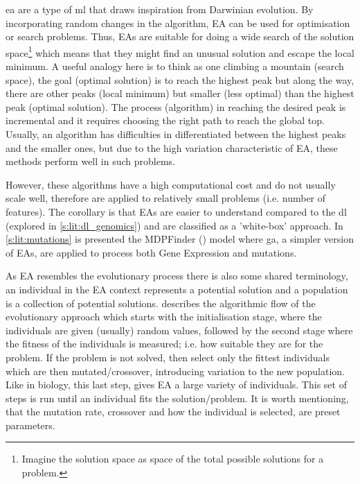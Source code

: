 \acrlong{ea} are a type of \acrshort{ml} that draws inspiration from Darwinian evolution. By incorporating random changes in the algorithm, EA can be used for optimisation or search problems. Thus, EAs are suitable for doing a wide search of the solution space\footnote{Imagine the solution space as space of the total possible solutions for a problem.} which means that they might find an unusual solution and escape the local minimum. A useful analogy here is to think as one climbing a mountain (search space), the goal (optimal solution) is to reach the highest peak but along the way, there are other peaks (local minimum) but smaller (less optimal) than the highest peak (optimal solution). The process (algorithm) in reaching the desired peak is incremental and it requires choosing the right path to reach the global top. Usually, an algorithm has difficulties in differentiated between the highest peaks and the smaller ones, but due to the high variation characteristic of EA, these methods perform well in such problems.


However, these algorithms have a high computational cost and do not usually scale well, therefore are applied to relatively small problems (i.e. number of features). The corollary is that EAs are easier to understand compared to the  \acrfull{dl} (explored in \cref{s:lit:dl_genomics}) and are classified as a 'white-box' approach. In \cref{s:lit:mutations} is presented the MDPFinder (\citet{Zhao2012-wj}) model where \acrfull{ga}, a simpler version of EAs, are applied to process both Gene Expression and mutations.


As EA resembles the evolutionary process there is also some shared terminology, an individual in the EA context represents a potential solution and a population is a collection of potential solutions.  describes the algorithmic flow of the evolutionary approach which starts with the initialisation stage, where the individuals are given (usually) random values, followed by the second stage where the fitness of the individuals is measured; i.e. how suitable they are for the problem. If the problem is not solved, then select only the fittest individuals which are then mutated/crossover, introducing variation to the new population. Like in biology, this last step, gives EA a large variety of individuals. This set of steps is run until an individual fits the solution/problem. It is worth mentioning, that the mutation rate, crossover and how the individual is selected, are preset parameters. 

